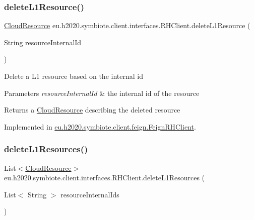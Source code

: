 \subsubsection{\texorpdfstring{delete\+L1\+Resource()}{deleteL1Resource()}}
{\footnotesize\ttfamily \hyperlink{classeu_1_1h2020_1_1symbiote_1_1cloud_1_1model_1_1internal_1_1CloudResource}{Cloud\+Resource} eu.\+h2020.\+symbiote.\+client.\+interfaces.\+R\+H\+Client.\+delete\+L1\+Resource (\begin{DoxyParamCaption}\item[{String}]{resource\+Internal\+Id }\end{DoxyParamCaption})}

Delete a L1 resource based on the internal id


\begin{DoxyParams}{Parameters}
{\em resource\+Internal\+Id} & the internal id of the resource \\
\hline
\end{DoxyParams}
\begin{DoxyReturn}{Returns}
a \hyperlink{}{Cloud\+Resource} describing the deleted resource 
\end{DoxyReturn}


Implemented in \hyperlink{classeu_1_1h2020_1_1symbiote_1_1client_1_1feign_1_1FeignRHClient_aef7c169c970267f47e7c56812c9a7422}{eu.\+h2020.\+symbiote.\+client.\+feign.\+Feign\+R\+H\+Client}.

\mbox{\label{interfaceeu_1_1h2020_1_1symbiote_1_1client_1_1interfaces_1_1RHClient_a69bba5fe6031648cc2636866cfe6f103}} 
\subsubsection{\texorpdfstring{delete\+L1\+Resources()}{deleteL1Resources()}}
{\footnotesize\ttfamily List$<$\hyperlink{classeu_1_1h2020_1_1symbiote_1_1cloud_1_1model_1_1internal_1_1CloudResource}{Cloud\+Resource}$>$ eu.\+h2020.\+symbiote.\+client.\+interfaces.\+R\+H\+Client.\+delete\+L1\+Resources (\begin{DoxyParamCaption}\item[{List$<$ String $>$}]{resource\+Internal\+Ids }\end{DoxyParamCaption})}

